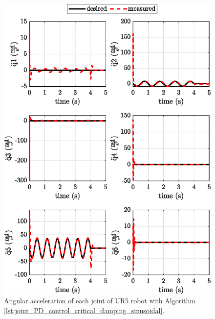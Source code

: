 \begin{figure}
    \centering
    \includegraphics{images/act_1.5_sin/joint_acceleration.eps}
    \caption{Angular acceleration of each joint of UR5 robot with Algorithm \ref{lst:joint_PD_control_critical_damping_sinusoidal}.}
    \label{fig:act_1.5_sin_joint_acceleration}
\end{figure}

